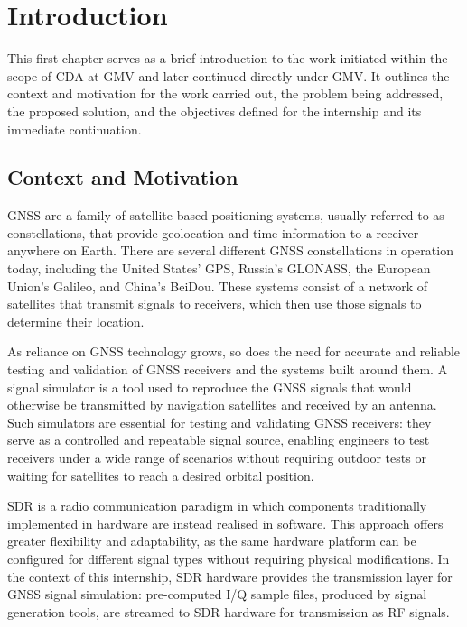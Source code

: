 
\chapter{Introduction}
\label{cha:introduction}

This first chapter serves as a brief introduction to the work initiated within
the scope of \gls{CDA} at \gls{GMV} and later continued directly under
\gls{GMV}. It outlines the context and motivation for the work carried out, the
problem being addressed, the proposed solution, and the objectives defined for
the internship and its immediate continuation.

\section{Context and Motivation}

\gls{GNSS} are a family of satellite-based positioning systems, usually
referred to as constellations, that provide geolocation and time information to
a receiver anywhere on Earth. There are several different \gls{GNSS}
constellations in operation today, including the United States' \gls{GPS},
Russia's \gls{GLONASS}, the European Union's \gls{Galileo}\cite{europaGalileo},
and China's \gls{BeiDou}. These systems consist of a network of satellites that
transmit signals to receivers, which then use those signals to determine their
location.

As reliance on \gls{GNSS} technology grows, so does the need for accurate and
reliable testing and validation of \gls{GNSS} receivers and the systems built
around them.\cite{europaWhatGNSS} A signal simulator is a tool used to
reproduce the \gls{GNSS} signals that would otherwise be transmitted by
navigation satellites and received by an
antenna.\cite{insidegnssVerificationTesting} Such simulators are essential for
testing and validating \gls{GNSS} receivers: they serve as a controlled and
repeatable signal source, enabling engineers to test receivers under a wide
range of scenarios without requiring outdoor tests or waiting for satellites to
reach a desired orbital position.\cite{spirentWhatGNSSGPS}

\gls{SDR} is a radio communication paradigm in which components traditionally
implemented in hardware are instead realised in software. This approach offers
greater flexibility and adaptability, as the same hardware platform can be
configured for different signal types without requiring physical
modifications.\cite{gnuradioRadio}\cite{wikipediaSoftwaredefinedRadio} In the
context of this internship, \gls{SDR} hardware provides the transmission
layer for \gls{GNSS} signal simulation: pre-computed \gls{I/Q} sample files,
produced by signal generation tools, are streamed to \gls{SDR} hardware for
transmission as \gls{RF} signals.

